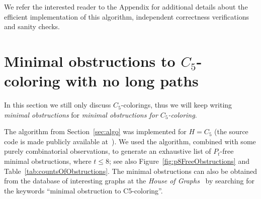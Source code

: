 \documentclass[11pt,a4paper]{article}
\theoremstyle{mystyle}
\newcommand{\hull}{\mathsf{hull}}
\begin{document}


We refer the interested reader to the Appendix for additional details about the efficient implementation of this algorithm, independent correctness verifications and sanity checks.



\section{Minimal obstructions to $C_5$-coloring with no long paths}\label{sec:finite}

In this section we still only discuss $C_5$-colorings, thus we will keep writing \emph{minimal obstructions} for \emph{minimal obstructions for $C_5$-coloring}.

The algorithm from Section~\ref{sec:algo} was implemented for $H=C_5$ (the source code is made publicly available at~\cite{gitrepo}). We used the algorithm, combined with some purely combinatorial observations, to generate an exhaustive list of $P_t$-free minimal obstructions, where $t \leq 8$; see also Figure~\ref{fig:p8FreeObstructions} and Table~\ref{tab:countsOfObstructions}.
The minimal obstructions can also be obtained from the database of interesting graphs at the \textit{House of Graphs}~\cite{DBLP:journals/dam/CoolsaetDG23} by searching for the keywords ``minimal obstruction to C5-coloring''.
\end{document}
